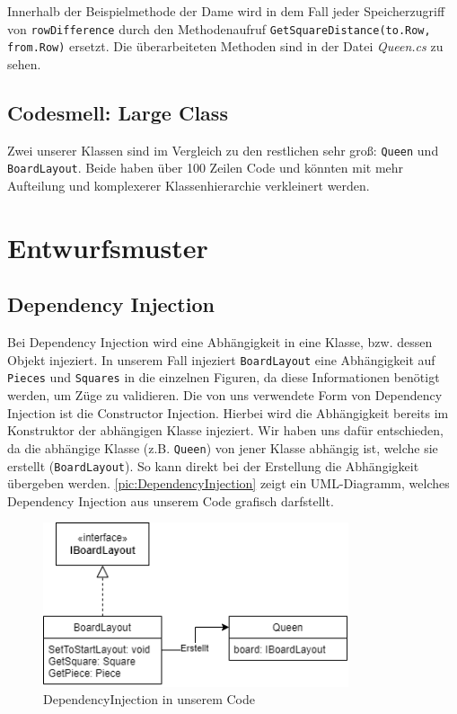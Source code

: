 \documentclass[
10pt, %
a4paper, %
oneside, %
headinclude,footinclude, %
BCOR5mm, %
]{scrartcl}
\begin{document}
\begin{onehalfspace}
Innerhalb der Beispielmethode der Dame wird in dem Fall jeder Speicherzugriff von \texttt{rowDifference} durch den Methodenaufruf \texttt{GetSquareDistance(to.Row, from.Row)} ersetzt. Die überarbeiteten Methoden sind in der Datei \textit{Queen.cs} zu sehen. 

\subsection{Codesmell: Large Class}
Zwei unserer Klassen sind im Vergleich zu den restlichen sehr groß: \texttt{Queen} und \texttt{BoardLayout}. Beide haben über 100 Zeilen Code und könnten mit mehr Aufteilung und komplexerer Klassenhierarchie verkleinert werden.

\newpage
\section{Entwurfsmuster}

\subsection{Dependency Injection}
\label{sec:depInjec}
Bei Dependency Injection wird eine Abhängigkeit in eine Klasse, bzw. dessen Objekt injeziert. In unserem Fall injeziert \texttt{BoardLayout} eine Abhängigkeit auf \texttt{Pieces} und \texttt{Squares} in die einzelnen Figuren, da diese Informationen benötigt werden, um Züge zu validieren. Die von uns verwendete Form von Dependency Injection ist die Constructor Injection. Hierbei wird die Abhängigkeit bereits im Konstruktor der abhängigen Klasse injeziert. Wir haben uns dafür entschieden, da die abhängige Klasse (z.B. \texttt{Queen}) von jener Klasse abhängig ist, welche sie erstellt (\texttt{BoardLayout}). So kann direkt bei der Erstellung die Abhängigkeit übergeben werden. \autoref{pic:DependencyInjection} zeigt ein UML-Diagramm, welches Dependency Injection aus unserem Code grafisch darfstellt.

\begin{figure}[h]
	\begin{center}
		\includegraphics[width=9cm]{DependencyInjection.png}
		\caption{\label{pic:DependencyInjection}DependencyInjection in unserem Code}
	\end{center}
\end{figure}


\end{onehalfspace}
\end{document}

